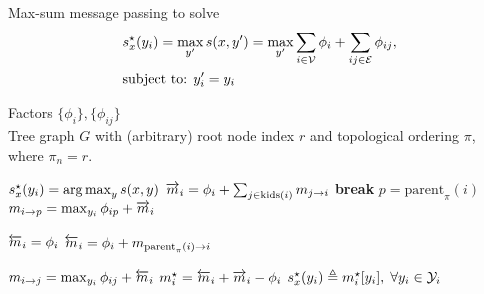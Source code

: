 

\begin{algorithm} 
\caption[max-sum inference]{Max-sum message passing to solve 
\begin{align}
&s^\star_x(y_i) =  \max_{y'} s(x,y') = \max_{y'} \sum_{i \in \mathcal{V}} \phi_i + \sum_{ij \in \mathcal{E}} \phi_{ij}, \\
&\text{subject to: } y_i' = y_i
\end{align}
} 
\label{alg:mm-inference} 
\begin{algorithmic} 

\REQUIRE $ $ \\ 
Factors $\{\phi_i\}, \{\phi_{ij}\}$\\
Tree graph $G$ with (arbitrary) root node index $r$ and topological ordering $\pi$, where $\pi_n = r$.

\ENSURE $s^\star_x(y_i) = \mathop{\arg\max}_{y} s(x,y)$ 
\STATE
$\overrightarrow{m}_i = \phi_i + \sum_{j \in \text{kids}(i)} m_{j \rightarrow i}$
 \STATE \textbf{break} \ENDIF
\STATE
$p = \text{parent}_\pi(i) $
\STATE
$m_{i \rightarrow p} = \max_{y_i} \phi_{ip} + \overrightarrow{m}_i$
\ENDFOR


\STATE $\overleftarrow{m}_i = \phi_i$
\ELSE
\STATE $\overleftarrow{m}_i = \phi_i + m_{\text{parent}_\pi(i) \rightarrow i}$
\ENDIF

\STATE $m_{i \rightarrow j} = \max_{y_i} \phi_{ij} + \overleftarrow{m}_i$
\ENDFOR
\ENDFOR
\STATE $m^\star_i = \overleftarrow{m}_i + \overrightarrow{m}_i - \phi_i$
\STATE $s^\star_x(y_i) \triangleq m^\star_i[y_i],\; \forall y_i \in \mathcal{Y}_i$

\end{algorithmic} 
\end{algorithm}



